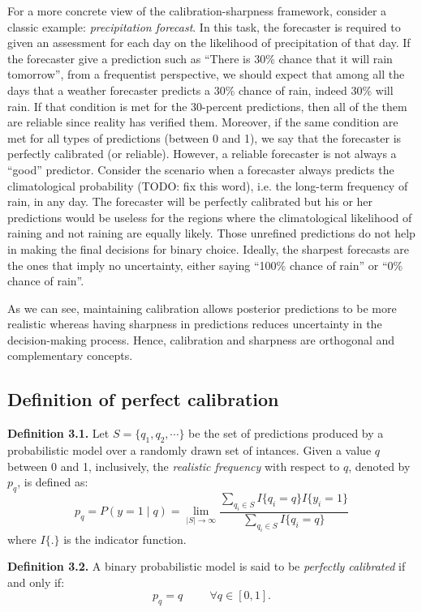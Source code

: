For a more concrete view of the calibration-sharpness framework, consider a classic example: \textit{precipitation forecast}. In this task, the forecaster is required to given an assessment for each day on the likelihood of precipitation of that day. If the forecaster give a prediction such as ``There is 30\% chance that it will rain tomorrow'', from a frequentist perspective, we should expect that among all the days that a weather forecaster predicts a 30\% chance of rain, indeed 30\% will rain. If that condition is met for the 30-percent predictions, then all of the them are reliable since reality has verified them. Moreover, if the same condition are met for all types of predictions (between 0 and 1), we say that the forecaster is perfectly calibrated (or reliable). However, a reliable forecaster is not always a ``good'' predictor. Consider the scenario when a forecaster always predicts the climatological probability (TODO: fix this word), i.e. the long-term frequency of rain, in any day. The forecaster will be perfectly calibrated but his or her predictions would be useless for the regions where the climatological likelihood of raining and not raining are equally likely. Those unrefined predictions do not help in making the final decisions for binary choice. Ideally, the sharpest forecasts are the ones that imply no uncertainty, either saying ``100\% chance of rain'' or ``0\% chance of rain''. 

As we can see, maintaining calibration allows posterior predictions to be more realistic whereas having sharpness in predictions reduces uncertainty in the decision-making process. Hence, calibration and sharpness are orthogonal and complementary concepts.    

\subsection{Definition of perfect calibration}

\textbf{Definition 3.1.} Let $S = \{q_1, q_2, \cdots\}$ be the set of predictions produced by a probabilistic model over a randomly drawn set of intances. Given a value $q$ between 0 and 1, inclusively, the \textit{realistic frequency} with respect to $q$, denoted by $p_q$, is defined as:
$$p_q = P(y = 1 \mid q) = \lim_{|S|\to\infty} \frac{\sum_{q_i\in S}I\{q_i = q\}I\{y_i = 1\}}{\sum_{q_i\in S}I\{q_i = q\}}$$ where $I\{.\}$ is the indicator function.

\textbf{Definition 3.2.} A binary probabilistic model is said to be \textit{perfectly calibrated} if and only if:
$$p_q = q \hspace{1cm} \forall q \in [0, 1].$$  

